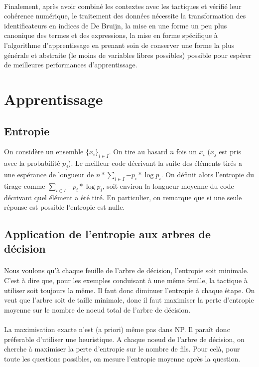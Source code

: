   \paragraph{}Finalement, après avoir combiné les contextes avec les tactiques et vérifié leur cohérence numérique, le traitement des données nécessite la transformation des identificateurs en indices de De Bruijn, la mise en une forme un peu plus canonique des termes et des expressions, la mise en forme spécifique à l'algorithme d'apprentissage en prenant soin de conserver une forme la plus générale et abstraite (le moins de variables libres possibles) possible pour espérer de meilleures performances d'apprentissage.




\section{Apprentissage}
\subsection*{Entropie}
On considère un ensemble $\{x_i\}_{i \in I}$. On tire au hasard $n$ fois un $x_i$ ($x_j$ est pris avec la probabilité $p_j$). Le meilleur code décrivant la suite des éléments tirés a une espérance de longueur de $n * \sum_{i \in I}{- p_i * \log{p_i}}$. On définit alors l'entropie du tirage comme $ \sum_{i \in I}{- p_i * \log{p_i}}$, soit environ la longueur moyenne du code décrivant quel élément a été tiré. En particulier, on remarque que si une seule réponse est possible l'entropie est nulle.

\subsection*{Application de l'entropie aux arbres de décision}
\paragraph{}Nous voulons qu'à chaque feuille de l'arbre de décision, l'entropie soit minimale. C'est à dire que, pour les exemples conduisant à une même feuille, la tactique à utiliser soit toujours la même. Il faut donc diminuer l'entropie à chaque étape. On veut que l'arbre soit de taille minimale, donc il faut maximiser la perte d'entropie moyenne sur le nombre de noeud total de l'arbre de décision.

\paragraph{}
La maximisation exacte n'est (a priori) même pas dans NP. Il paraît donc préferable d'utiliser une heuristique. A chaque noeud de l'arbre de décision, on cherche à maximiser la perte d'entropie sur le nombre de fils. Pour celà, pour toute les questions possibles, on mesure l'entropie moyenne après la question.

